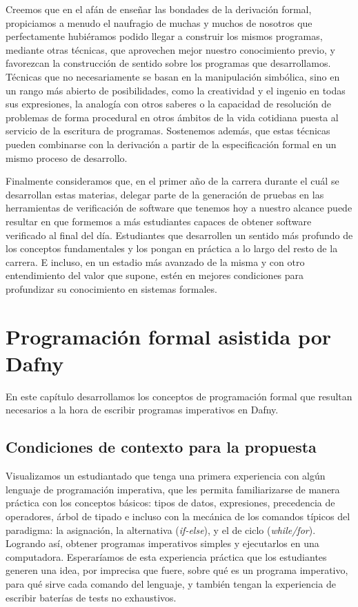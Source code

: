 \documentclass[12pt, a4paper, openany, fleqn]{book}
\begin{document}
    Creemos que en el afán de enseñar las bondades de la derivación formal, propiciamos a menudo el naufragio de muchas y muchos de nosotros que perfectamente hubiéramos podido llegar a construir los mismos programas, mediante otras técnicas, que aprovechen mejor nuestro conocimiento previo, y favorezcan la construcción de sentido sobre los programas que desarrollamos. Técnicas que no necesariamente se basan en la manipulación simbólica, sino en un rango más abierto de posibilidades, como la creatividad y el ingenio en todas  sus expresiones, la analogía con otros saberes o la capacidad de resolución de problemas de forma procedural en otros ámbitos de la vida cotidiana puesta al servicio de la escritura de programas. Sostenemos además, que estas técnicas pueden combinarse con la derivación a partir de la especificación formal en un mismo proceso de desarrollo.

    Finalmente consideramos que, en el primer año de la carrera durante el cuál se desarrollan estas materias, delegar parte de la generación de pruebas en las herramientas de verificación de software que tenemos hoy a nuestro alcance puede resultar en que formemos a más estudiantes capaces de obtener software verificado al final del día. Estudiantes que desarrollen un sentido más profundo de los conceptos fundamentales y los pongan en práctica a lo largo del resto de la carrera. E incluso, en un estadio más avanzado de la misma y con otro entendimiento del valor que supone, estén en mejores condiciones para profundizar su conocimiento en sistemas formales.

    \chapter{Programación formal asistida por Dafny}

    En este capítulo desarrollamos los conceptos de programación formal que resultan necesarios a la hora de escribir programas imperativos en Dafny.

    \section{Condiciones de contexto para la propuesta}
    Visualizamos un estudiantado que tenga una primera experiencia con algún lenguaje de programación imperativa, que les permita familiarizarse de manera práctica con los conceptos básicos: tipos de datos, expresiones, precedencia de operadores, árbol de tipado e incluso con la mecánica de los comandos típicos del paradigma: la asignación, la alternativa (\textit{if-else}), y el de ciclo (\textit{while/for}). Logrando así, obtener programas imperativos simples y ejecutarlos en una computadora. Esperaríamos de esta experiencia práctica que los estudiantes generen una idea, por imprecisa que fuere, sobre qué es un programa imperativo, para qué sirve cada comando del lenguaje, y también tengan la experiencia de escribir baterías de tests no exhaustivos.
\end{document}
